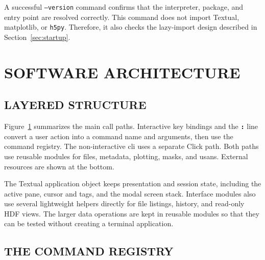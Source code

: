 \documentclass[tm]{ornltm}
\newcommand{\key}[1]{\textbf{\texttt{#1}}}
\begin{document}
A successful \texttt{--version} command confirms that the interpreter, package,
and entry point are resolved correctly. This command does not import Textual,
matplotlib, or \texttt{h5py}. Therefore, it also checks the lazy-import design
described in Section~\ref{sec:startup}.

\section{SOFTWARE ARCHITECTURE}
\label{sec:arch}

\subsection{LAYERED STRUCTURE}

Figure~\ref{fig:arch} summarizes the main call paths. Interactive key bindings
and the \key{:} line convert a user action into a command name and arguments,
then use the command registry. The non-interactive \ac{cli} uses a separate
Click path. Both paths use reusable modules for files, metadata, plotting,
masks, and \ac{usans}. External resources are shown at the bottom.

\begin{figure}[ht]
  \centering
  \resizebox{\textwidth}{!}{}
  \label{fig:arch}
\end{figure}

The Textual application object keeps presentation and session state, including
the active pane, cursor and tags, and the modal screen stack. Interface modules
also use several lightweight helpers directly for file listings, history, and
read-only HDF views. The larger data operations are kept in reusable modules so
that they can be tested without creating a terminal application.

\subsection{THE COMMAND REGISTRY}
\label{sec:registry}
\end{document}
